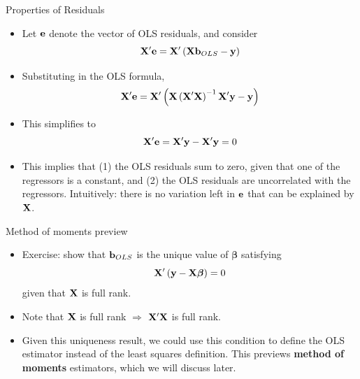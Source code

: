 \documentclass[english,xcolor={dvipsnames},aspectratio=169]{beamer}
\begin{document}
\begin{frame}{Properties of Residuals}
\begin{itemize}
	\item Let ${\bf e} $ denote the vector of OLS residuals, and consider \[
		{\bf X}' {\bf e} = {\bf X}' \left({\bf X} {\bf b}_{OLS} - {\bf y} \right) 
	\]
	\item Substituting in the OLS formula, 
 \[
		{\bf X}' {\bf e} = {\bf X}' \left({\bf X} \left({\bf X}'{\bf X}\right)^{-1} {\bf X}' {\bf y} - {\bf y} \right) 
	\]

\item This simplifies to 
 \[
		{\bf X}' {\bf e} = {\bf X}' {\bf y} -  {\bf X}' {\bf y}  = 0
	\]

	\item This implies that (1) the OLS residuals sum to zero, given that one of the regressors is a constant, and
	(2) the OLS residuals are uncorrelated with the regressors. Intuitively: there is no variation left in ${\bf e} $
	 that can be explained by ${\bf X}$.
	
\end{itemize}
\end{frame}


\begin{frame}{Method of moments preview}
\begin{itemize}
	\item Exercise: show that ${\bf b}_{OLS}$ is the unique value of $\boldsymbol{\beta}$ satisfying 
	\[
		{\bf X}' \left({\bf y} - {\bf X} \boldsymbol{\beta}  \right) =0
	\]
	given that ${\bf X}$ is full rank.

	\medskip
	\item Note that ${\bf X}$ is full rank $\Rightarrow$ ${\bf X}'{\bf X}$ is full rank.

	\medskip 
	\item Given this uniqueness result, we could use this condition to define the OLS estimator 
	instead of the least squares definition. 
	This previews {\bf method of moments} estimators, which we will discuss later.
	
\end{itemize}
\end{frame}

\end{document}
